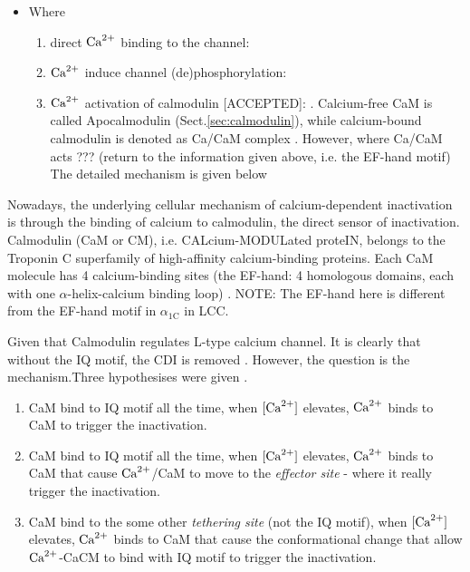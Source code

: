\begin{itemize}
\begin{enumerate}
  \end{enumerate}
  \item Where
  \begin{enumerate}
    \item direct ${\text{Ca}^{2+}}$ binding to the channel: \citep{sherman1990,
    Keizer1992,standen1982bsm}
    \item ${\text{Ca}^{2+}}$ induce channel (de)phosphorylation: \citep{chad1986,
    armstrong1989}
    \item ${\text{Ca}^{2+}}$ activation of calmodulin [ACCEPTED]: \citep{chad1986,
    armstrong1989, peterson1999}. Calcium-free CaM is called Apocalmodulin
    (Sect.\ref{sec:calmodulin}), while calcium-bound calmodulin is denoted as
    Ca/CaM complex \citep{jurado1999}. However, where Ca/CaM acts ??? (return to the
    information given above, i.e. the EF-hand motif) The detailed mechanism is
    given below
  \end{enumerate} 
\end{itemize} 

Nowadays, the underlying cellular mechanism of calcium-dependent inactivation is
through the binding of calcium to calmodulin, the direct sensor of inactivation.
Calmodulin (CaM or CM), i.e. CALcium-MODULated proteIN, belongs to the Troponin
C superfamily of high-affinity calcium-binding proteins. Each CaM molecule has 4
calcium-binding sites (the EF-hand: 4 homologous domains, each with one
$\alpha$-helix-calcium binding loop) \citep{kretsinger1980}. NOTE: The EF-hand
here is different from the EF-hand motif in $\alpha_\text{1C}$ in LCC.
 
Given that Calmodulin regulates L-type calcium channel. It is clearly that
without the IQ motif, the CDI is removed \citep{qin1999}. However, the question
is the mechanism.Three hypothesises were given \citep{ehlers1999calm}.
\begin{enumerate}
  \item CaM bind to IQ motif all the time, when $[{\text{Ca}^{2+}}]$ elevates, ${\text{Ca}^{2+}}$ binds to
  CaM to trigger the inactivation.
  
  \item CaM bind to IQ motif all the time, when $[{\text{Ca}^{2+}}]$ elevates, ${\text{Ca}^{2+}}$ binds to
  CaM that cause ${\text{Ca}^{2+}}$/CaM to move to the {\it effector site} - where it really
  trigger the inactivation.
  
  \item CaM bind to the some other {\it tethering site} (not the IQ motif), when
  $[{\text{Ca}^{2+}}]$ elevates, ${\text{Ca}^{2+}}$ binds to CaM that cause the conformational change that
  allow ${\text{Ca}^{2+}}$-CaCM to bind with IQ motif to trigger the inactivation.
\end{enumerate}

